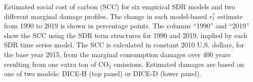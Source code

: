 \begin{table}[!htbp]
\begin{threeparttable}
\begin{tablenotes}[flushleft]
\footnotesize
\item Estimated social cost of carbon (SCC) for six empirical SDR models and two different marginal damage profiles. The change in each model-based $r_t^{*}$ estimate from 
1990 to 2019 is shown in percentage points. The columns ``1990'' and ``2019'' show the SCC using the SDR term structures for 1990 and 2019, implied by each SDR time series model. The SCC is calculated in constant 2010 U.S. dollars, for the base year 2015, from the marginal consumption damages over 400 years resulting from one extra ton of CO$_2$ emissions. Estimated damages are based on one of two models: DICE-H (top panel) or DICE-D (lower panel).
\end{tablenotes}
\end{threeparttable}
\end{table}
